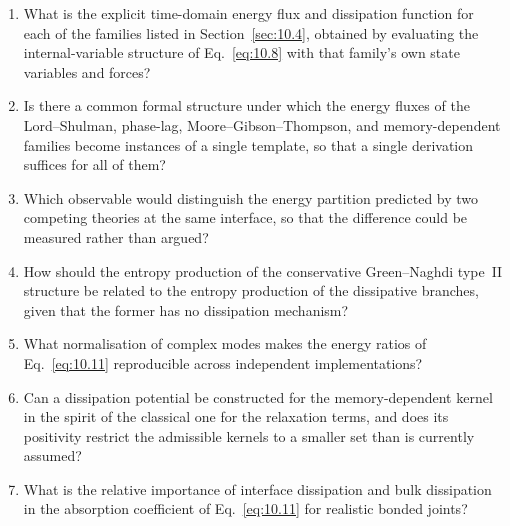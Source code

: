 \begin{enumerate}[label=\textbf{OQ10.\arabic*}]
\item What is the explicit time-domain energy flux and dissipation function for each of the families listed in Section~\ref{sec:10.4}, obtained by evaluating the internal-variable structure of Eq.~\eqref{eq:10.8} with that family's own state variables and forces? \label{oq:10.1}
\item Is there a common formal structure under which the energy fluxes of the Lord--Shulman, phase-lag, Moore--Gibson--Thompson, and memory-dependent families become instances of a single template, so that a single derivation suffices for all of them? \label{oq:10.2}
\item Which observable would distinguish the energy partition predicted by two competing theories at the same interface, so that the difference could be measured rather than argued? \label{oq:10.3}
\item How should the entropy production of the conservative Green--Naghdi type~II structure be related to the entropy production of the dissipative branches, given that the former has no dissipation mechanism? \label{oq:10.4}
\item What normalisation of complex modes makes the energy ratios of Eq.~\eqref{eq:10.11} reproducible across independent implementations? \label{oq:10.5}
\item Can a dissipation potential be constructed for the memory-dependent kernel in the spirit of the classical one for the relaxation terms, and does its positivity restrict the admissible kernels to a smaller set than is currently assumed? \label{oq:10.6}
\item What is the relative importance of interface dissipation and bulk dissipation in the absorption coefficient of Eq.~\eqref{eq:10.11} for realistic bonded joints? \label{oq:10.7}
\end{enumerate}

